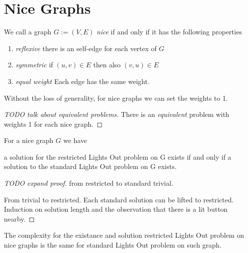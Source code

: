 \section{Nice Graphs}
We call a graph $G:=(V, E)$ \emph{nice} if and only if it has the following properties

\begin{enumerate}
    \item \emph{reflexive} there is an self-edge for each vertex of $G$
    \item \emph{symmetric} if $(u,v)\in E$ then also $(v,u)\in E$
    \item \emph{equal weight} Each edge has the same weight.
\end{enumerate}

Without the loss of generality, for nice graphs we can set the weights to 1.

\begin{proof}[TODO talk about equivalent problems]
    There is an \emph{equivalent} problem with weights 1 for each nice graph.
\end{proof}

\begin{theorem}
    For a nice graph $G$ we have

    a solution for the restricted Lights Out problem on G exists if and only if a solution to the standard Lights Out problem on G exists.
\end{theorem}

\begin{proof}[TODO expand proof]
    from restricted to standard trivial.

    From trivial to restricted. Each standard solution can be lifted to restricted. Induction on solution length and the observation that there is a lit button nearby. 
\end{proof}

\begin{corollary}
    The complexity for the existance and solution restricted Lights Out problem on nice graphs is the same for standard Lights Out problem on such graph.
\end{corollary}